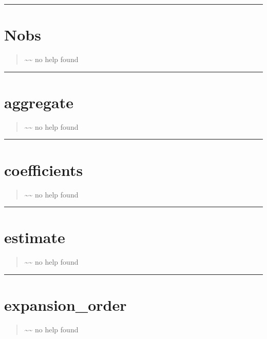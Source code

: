 \documentclass[letterpaper,10pt,english]{sphinxmanual}
\begin{document}
\bigskip\hrule{}\bigskip



\section{Nobs}
\label{classes/utils/@hdmr/hdmr:nobs}\label{classes/utils/@hdmr/hdmr:id4}\begin{quote}

\textasciitilde{}\textasciitilde{} no help found
\end{quote}


\bigskip\hrule{}\bigskip



\section{aggregate}
\label{classes/utils/@hdmr/hdmr:aggregate}\label{classes/utils/@hdmr/hdmr:id5}\begin{quote}

\textasciitilde{}\textasciitilde{} no help found
\end{quote}


\bigskip\hrule{}\bigskip



\section{coefficients}
\label{classes/utils/@hdmr/hdmr:id6}\label{classes/utils/@hdmr/hdmr:coefficients}\begin{quote}

\textasciitilde{}\textasciitilde{} no help found
\end{quote}


\bigskip\hrule{}\bigskip



\section{estimate}
\label{classes/utils/@hdmr/hdmr:id7}\label{classes/utils/@hdmr/hdmr:estimate}\begin{quote}

\textasciitilde{}\textasciitilde{} no help found
\end{quote}


\bigskip\hrule{}\bigskip



\section{expansion\_order}
\label{classes/utils/@hdmr/hdmr:id8}\label{classes/utils/@hdmr/hdmr:expansion-order}\begin{quote}

\textasciitilde{}\textasciitilde{} no help found
\end{quote}
\end{document}
